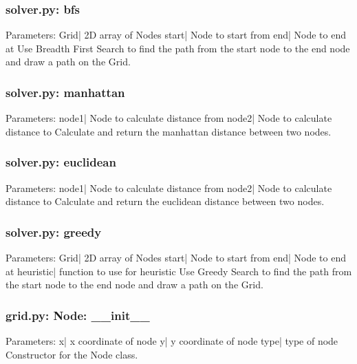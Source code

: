 \documentclass{article}
\begin{document}
\subsubsection{solver.py: bfs}
Parameters:\newline
\indent Grid| 2D array of Nodes\newline
\indent start| Node to start from\newline
\indent end| Node to end at\newline
Use Breadth First Search to find the path from the start node to the end node and draw a path on the Grid.

\subsubsection{solver.py: manhattan}
Parameters:\newline
\indent node1| Node to calculate distance from\newline
\indent node2| Node to calculate distance to\newline
Calculate and return the manhattan distance between two nodes.

\subsubsection{solver.py: euclidean}
Parameters:\newline
\indent node1| Node to calculate distance from\newline
\indent node2| Node to calculate distance to\newline
Calculate and return the euclidean distance between two nodes.

\subsubsection{solver.py: greedy}
Parameters:\newline
\indent Grid| 2D array of Nodes\newline
\indent start| Node to start from\newline
\indent end| Node to end at\newline
\indent heuristic| function to use for heuristic\newline
Use Greedy Search to find the path from the start node to the end node and draw a path on the Grid.

\subsubsection{grid.py: Node: \_\_init\_\_}
Parameters:\newline
\indent x| x coordinate of node\newline
\indent y| y coordinate of node\newline
\indent type| type of node\newline
Constructor for the Node class.
\end{document}
